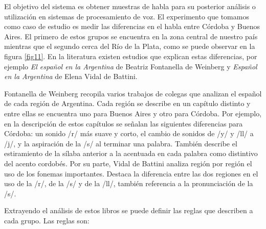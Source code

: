 El objetivo del sistema es obtener muestras de habla para su posterior análisis o utilización en sistemas de procesamiento de voz. El experimento que tomamos como caso de estudio es medir las diferencias en el habla entre Córdoba y Buenos Aires. El primero de estos grupos se encuentra en la zona central de nuestro país mientras que el segundo cerca del Río de la Plata, como se puede observar en la figura \ref{fig11}. En la literatura existen estudios que explican estas diferencias, por ejemplo \textit{El español en la Argentina} \cite{Fontanella2000} de Beatriz Fontanella de Weinberg y \textit{Español en la Argentina} \cite{Vidal1964} de Elena Vidal de Battini. 

Fontanella de Weinberg recopila varios trabajos de colegas que analizan el español de cada región de Argentina. Cada región se describe en un capítulo distinto y entre ellas se encuentra uno para Buenos Aires y otro para Córdoba. Por ejemplo, en la descripción de estos capítulos se señalan las siguientes diferencias para Córdoba: un sonido /r/ más suave y corto, el cambio de sonidos de /y/ y /ll/ a /j/, y la aspiración de la /s/ al terminar una palabra. También describe el estiramiento de la sílaba anterior a la acentuada en cada palabra como distintivo del acento cordobés. Por su parte, Vidal de Battini analiza región por región el uso de los fonemas importantes. Destaca la diferencia entre las dos regiones en el uso de la /r/, de la /s/ y de la /ll/, también referencia a la pronunciación de la /s/.

Extrayendo el análisis de estos libros se puede definir las reglas que describen a cada grupo. Las reglas son: 

